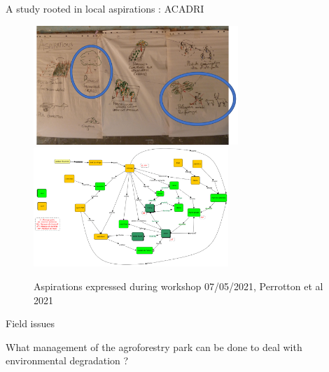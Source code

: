\documentclass[aspectratio=169]{beamer}
\begin{document}
\begin{frame}{A study rooted in local aspirations : ACADRI}
    \begin{center}
        \vspace{-1em}
        \begin{figure}
            \centering
            \includegraphics[height = 4.5cm]{img/photoAspiration.png}~
            \includegraphics[height = 4.5cm]{img/modeleConceptuel.png}
            \caption{Aspirations expressed during workshop 07/05/2021, Perrotton et al 2021 }
        \end{figure}
    \end{center}
\end{frame}



\begin{frame}{Field issues}
    \begin{center}
        \large{What management of the agroforestry park can be done to deal with environmental degradation ?}
    \end{center}
\end{frame}
\end{document}
